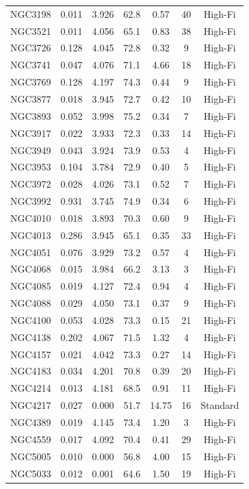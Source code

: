 \begin{longtable}{lcccccc}
NGC3198 & 0.011 & 3.926 & 62.8 & 0.57 & 40 & High-Fi \\
NGC3521 & 0.011 & 4.056 & 65.1 & 0.83 & 38 & High-Fi \\
NGC3726 & 0.128 & 4.045 & 72.8 & 0.32 & 9 & High-Fi \\
NGC3741 & 0.047 & 4.076 & 71.1 & 4.66 & 18 & High-Fi \\
NGC3769 & 0.128 & 4.197 & 74.3 & 0.44 & 9 & High-Fi \\
NGC3877 & 0.018 & 3.945 & 72.7 & 0.42 & 10 & High-Fi \\
NGC3893 & 0.052 & 3.998 & 75.2 & 0.34 & 7 & High-Fi \\
NGC3917 & 0.022 & 3.933 & 72.3 & 0.33 & 14 & High-Fi \\
NGC3949 & 0.043 & 3.924 & 73.9 & 0.53 & 4 & High-Fi \\
NGC3953 & 0.104 & 3.784 & 72.9 & 0.40 & 5 & High-Fi \\
NGC3972 & 0.028 & 4.026 & 73.1 & 0.52 & 7 & High-Fi \\
NGC3992 & 0.931 & 3.745 & 74.9 & 0.34 & 6 & High-Fi \\
NGC4010 & 0.018 & 3.893 & 70.3 & 0.60 & 9 & High-Fi \\
NGC4013 & 0.286 & 3.945 & 65.1 & 0.35 & 33 & High-Fi \\
NGC4051 & 0.076 & 3.929 & 73.2 & 0.57 & 4 & High-Fi \\
NGC4068 & 0.015 & 3.984 & 66.2 & 3.13 & 3 & High-Fi \\
NGC4085 & 0.019 & 4.127 & 72.4 & 0.94 & 4 & High-Fi \\
NGC4088 & 0.029 & 4.050 & 73.1 & 0.37 & 9 & High-Fi \\
NGC4100 & 0.053 & 4.028 & 73.3 & 0.15 & 21 & High-Fi \\
NGC4138 & 0.202 & 4.067 & 71.5 & 1.32 & 4 & High-Fi \\
NGC4157 & 0.021 & 4.042 & 73.3 & 0.27 & 14 & High-Fi \\
NGC4183 & 0.034 & 4.201 & 70.8 & 0.39 & 20 & High-Fi \\
NGC4214 & 0.013 & 4.181 & 68.5 & 0.91 & 11 & High-Fi \\
NGC4217 & 0.027 & 0.000 & 51.7 & 14.75 & 16 & Standard \\
NGC4389 & 0.019 & 4.145 & 73.4 & 1.20 & 3 & High-Fi \\
NGC4559 & 0.017 & 4.092 & 70.4 & 0.41 & 29 & High-Fi \\
NGC5005 & 0.010 & 0.000 & 56.8 & 4.00 & 15 & High-Fi \\
NGC5033 & 0.012 & 0.001 & 64.6 & 1.50 & 19 & High-Fi \\

\end{longtable}
